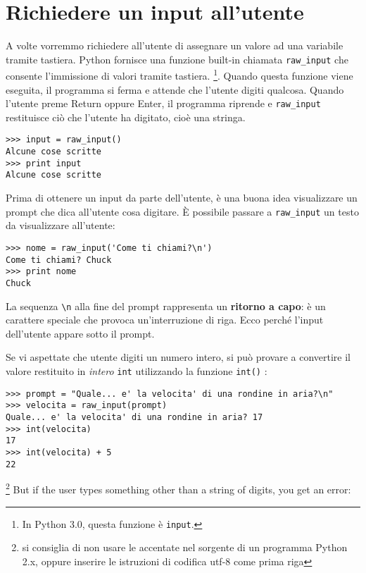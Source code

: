 \section{Richiedere un input all'utente} 

A volte vorremmo richiedere all'utente di assegnare un valore ad una variabile tramite tastiera. Python fornisce una funzione built-in chiamata
\verb"raw_input" che consente l'immissione di valori tramite tastiera.
\footnote{In Python
3.0, questa funzione \`{e}  {\tt input}.}.  Quando questa funzione viene eseguita, il programma si ferma e attende che l'utente digiti qualcosa. Quando l'utente preme  {\sf Return} oppure {\sf Enter}, il programma riprende e \verb"raw_input" restituisce ci\`{o} che l'utente ha digitato, cio\`{e} una stringa.

 

\beforeverb \begin{verbatim}
>>> input = raw_input()
Alcune cose scritte
>>> print input
Alcune cose scritte \end{verbatim} \afterverb
%
Prima di ottenere un input da parte dell'utente, \`{e} una buona idea visualizzare un prompt che dica all'utente cosa digitare. 
\`{E} possibile passare a \verb"raw_input"  un testo da visualizzare all'utente:


\beforeverb \begin{verbatim}
>>> nome = raw_input('Come ti chiami?\n')
Come ti chiami? Chuck
>>> print nome
Chuck \end{verbatim} \afterverb
%
La sequenza \verb"\n" alla fine del prompt rappresenta un \textbf{ritorno a capo}: \`{e} un carattere speciale che provoca un'interruzione di riga. Ecco perch\'{e} l'input dell'utente appare sotto il prompt.


Se vi aspettate che utente digiti un numero intero, si pu\`{o} provare a convertire il valore restituito in \emph{intero } {\tt int} utilizzando la funzione  {\tt int()} :

\beforeverb \begin{verbatim}
>>> prompt = "Quale... e' la velocita' di una rondine in aria?\n"
>>> velocita = raw_input(prompt)
Quale... e' la velocita' di una rondine in aria? 17
>>> int(velocita)
17
>>> int(velocita) + 5
22 \end{verbatim} \afterverb 
\footnote{si consiglia di non usare le accentate nel sorgente di un programma Python 2.x, oppure inserire le istruzioni di codifica utf-8 come prima riga}
%
But if the user types something other than a string of digits, you get
an error:

